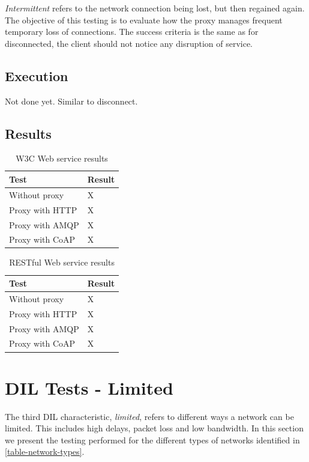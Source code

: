 \textit{Intermittent} refers to the network connection being lost, but then
regained again. The objective of this testing is to evaluate how the proxy
manages frequent temporary loss of connections. The success criteria is the same
as for disconnected, the client should not notice any disruption of service.

\subsection{Execution}

Not done yet. Similar to disconnect.

\subsection{Results}

\begin{table}[H]
\begin{tabular}{| l | l |}
\hline
  \textbf{Test} & \textbf{Result} \\ \hline
  Without proxy & X \\ \hline
  Proxy with HTTP & X \\ \hline
  Proxy with AMQP & X \\ \hline
  Proxy with CoAP & X \\ \hline
\end{tabular}
\caption{W3C Web service results}
\end{table}

\begin{table}[H]
\begin{tabular}{| l | l |}
\hline
  \textbf{Test} & \textbf{Result} \\ \hline
  Without proxy & X \\ \hline
  Proxy with HTTP & X \\ \hline
  Proxy with AMQP & X \\ \hline
  Proxy with CoAP & X \\ \hline
\end{tabular}
\caption{RESTful Web service results}
\end{table}

\section{DIL Tests - Limited}

The third DIL characteristic, \textit{limited}, refers to different ways a
network can be limited. This includes high delays, packet loss and low
bandwidth. In this section we present the testing performed for the different
types of networks identified in \cref{table-network-types}.



